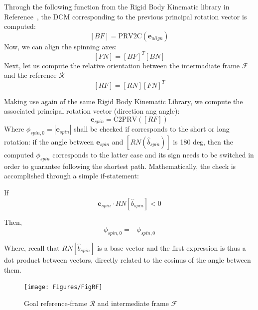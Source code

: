 \documentclass[]{AVSSimReportMemo}
\begin{document}
\newline
Through the following function from the Rigid Body Kinematic library in Reference~, the DCM corresponding to the previous principal rotation vector is computed:
\begin{equation}
	\label{eq:BF}
	[BF] = \textrm{PRV2C}(\bm{e}_{align})
\end{equation}
Now, we can align the spinning axes:
\begin{equation}
	\label{eq:FN}
	[FN] = [BF]^{T}[BN]
\end{equation}
Next, let us compute the relative orientation between the intermadiate frame $\mathcal{F}$ and the reference $\mathcal{R}$
\begin{equation}
	\label{eq:RF}
	[RF] = [RN][FN]^T
\end{equation}

Making use again of the same Rigid Body Kinematic Library, we compute the associated principal rotation vector (direction ang angle):
\begin{equation}
	\label{eq:e_spin}
	\bm{e}_{spin} = \textrm{C2PRV}([RF])
\end{equation}
Where $ \phi_{spin, 0} = |\bm{e}_{spin}| $ shall be checked if corresponds to the short or long rotation:
if the angle between $\bm{e}_{spin}$ and $[RN(\hat{b}_{spin})]$ is 180 deg, then the computed $\phi_{spin}$ corresponds to the latter case and its sign needs to be switched in order to guarantee following the shortest path. \newline
Mathematically, the check is accomplished through a simple if-statement:

If
$$\bm{e}_{spin} \cdot RN[\hat{b}_{spin}] < 0 $$

Then,
$$\phi_{spin,0} = -\phi_{spin, 0}$$

Where, recall that $RN[\hat{b}_{spin}]$ is a base vector and the first expression is thus a dot product between vectors, directly related to the cosinus of the angle between them.

\begin{figure}[htb]
	\centerline{
		\texttt{[image: Figures/FigRF]}
	}
	\caption{Goal reference-frame $\mathcal{R}$  and intermediate frame $\mathcal{F}$ }
	\label{fig:Fig4}
\end{figure} 




\end{document}
